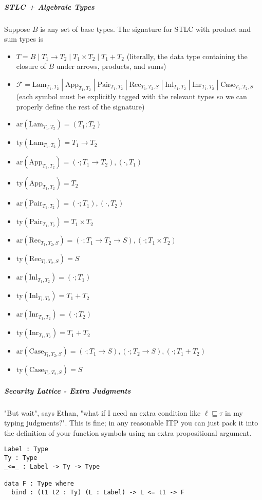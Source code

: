 \documentclass{article}
\theoremstyle{definition}
\begin{document}
\subparagraph{STLC + Algebraic Types} Suppose $B$ is any set of base types. The signature for STLC with product and sum types is
\begin{itemize}
	\item $T = B \;|\; T_1 \rightarrow T_2 \;|\; T_1 \times T_2 \;|\; T_1 + T_2$ (literally, the data type containing the closure of $B$ under arrows, products, and sums)
	\item $\mathcal{F} = \text{Lam}_{T_1,T_2} \;|\; \text{App}_{T_1,T_2} \;|\; \text{Pair}_{T_1,T_2} \;|\; \text{Rec}_{T_1,T_2,S} \;|\; \text{Inl}_{T_1,T_2} \;|\; \text{Inr}_{T_1,T_2} \;|\; \text{Case}_{T_1,T_2,S}$ (each symbol must be explicitly tagged with the relevant types so we can properly define the rest of the signature)
	\item $\text{ar}(\text{Lam}_{T_1,T_2}) = (T_1;T_2)$
	\item $\text{ty}(\text{Lam}_{T_1,T_2}) = T_1 \rightarrow T_2$
	\item $\text{ar}(\text{App}_{T_1,T_2}) = (\cdot;T_1 \rightarrow T_2),(\cdot,T_1)$
	\item $\text{ty}(\text{App}_{T_1,T_2}) = T_2$
	\item $\text{ar}(\text{Pair}_{T_1,T_2}) = (\cdot;T_1),(\cdot,T_2)$
	\item $\text{ty}(\text{Pair}_{T_1,T_2}) = T_1 \times T_2$
	\item $\text{ar}(\text{Rec}_{T_1,T_2,S}) = (\cdot;T_1 \rightarrow T_2 \rightarrow S),(\cdot;T_1 \times T_2)$
	\item $\text{ty}(\text{Rec}_{T_1,T_2,S}) = S$
	\item $\text{ar}(\text{Inl}_{T_1,T_2}) = (\cdot;T_1)$
	\item $\text{ty}(\text{Inl}_{T_1,T_2}) = T_1 + T_2$
	\item $\text{ar}(\text{Inr}_{T_1,T_2}) = (\cdot;T_2)$
	\item $\text{ty}(\text{Inr}_{T_1,T_2}) = T_1 + T_2$
	\item $\text{ar}(\text{Case}_{T_1,T_2,S}) = (\cdot;T_1 \rightarrow S),(\cdot;T_2 \rightarrow S),(\cdot;T_1 + T_2)$
	\item $\text{ty}(\text{Case}_{T_1,T_2,S}) = S$
\end{itemize}
\subparagraph{Security Lattice - Extra Judgments} "But wait", says Ethan, "what if I need an extra condition like $\ell \sqsubseteq \tau$ in my typing judgments?". This is fine; in any reasonable ITP you can just pack it into the definition of your function symbols using an extra propositional argument.
\begin{verbatim}
Label : Type
Ty : Type
_<=_ : Label -> Ty -> Type

data F : Type where
  bind : (t1 t2 : Ty) (L : Label) -> L <= t1 -> F
\end{verbatim}
\end{document}
